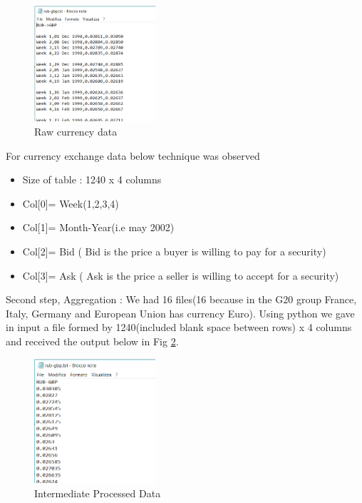 \begin{figure}[!h]
	\begin{center}
		\includegraphics[width=0.40\textwidth]{aaa2.png}
		\caption{Raw currency data}
		\label{raw_curr}
	\end{center}
\end{figure}


For currency exchange data below technique was observed
\begin{itemize} 
\item Size of table : 1240 x 4 columns 
\item Col[0]= Week(1,2,3,4) 
\item Col[1]= Month-Year(i.e may 2002) 
\item Col[2]= Bid ( Bid is the price a buyer is willing to pay for a security) 
\item Col[3]= Ask ( Ask is the price a seller is willing to accept for a security) 
\end{itemize}

Second step, Aggregation : We had 16 files(16 because in the G20 group France, Italy, Germany and European Union has currency Euro).  Using python we gave in input a file formed by 1240(included blank space between rows) x 4 columns and received the output below in Fig \ref{part_proccessed}. 
\newline

\begin{figure}[!h]
	\begin{center}
		\includegraphics[width=0.40\textwidth]{aaa1.png}
		\caption{Intermediate Processed Data}
		\label{part_proccessed}
	\end{center}
\end{figure}

